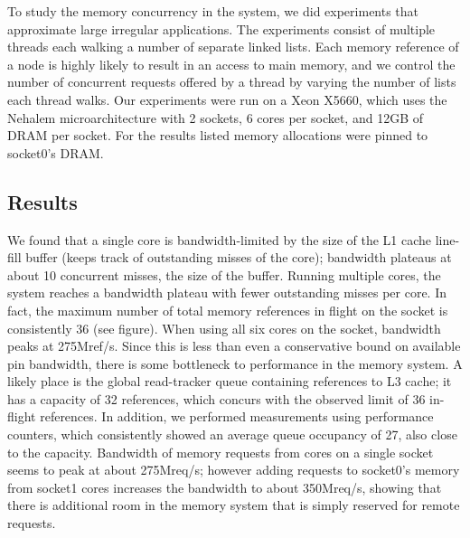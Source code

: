 

To study the memory concurrency in the system, we did experiments that approximate large irregular applications. The experiments consist of multiple threads each walking a number of separate linked lists. Each memory reference of a node is highly likely to result in an access to main memory, and we control the number of concurrent requests offered by a thread by varying the number of lists each thread walks.   Our experiments were run on a Xeon X5660, which uses the Nehalem microarchitecture with 2 sockets, 6 cores per socket, and 12GB of DRAM per socket. For the results listed memory allocations were pinned to socket0's DRAM.
\subsection{Results} 
	We found that a single core is bandwidth-limited by the size of the L1 cache line-fill buffer (keeps track of outstanding misses of the core); bandwidth plateaus at about 10 concurrent misses, the size of the buffer. Running multiple cores, the system reaches a bandwidth plateau with fewer outstanding misses per core. In fact, the maximum number of total memory references in flight on the socket is consistently 36 (see figure). When using all six cores on the socket, bandwidth peaks at 275Mref/s. Since this is less than even a conservative bound on available pin bandwidth, there is some bottleneck to performance in the memory system. A likely place is the global read-tracker queue containing references to L3 cache; it has a capacity of 32 references, which concurs with the observed limit of 36 in-flight references. In addition, we performed measurements using performance counters, which consistently showed an average queue occupancy of 27, also close to the capacity.
   
	Bandwidth of memory requests from cores on a single socket seems to peak at about 275Mreq/s; however adding requests to socket0's memory from socket1 cores increases the bandwidth to about	350Mreq/s, showing that there is additional room in the memory system that is simply reserved for remote requests.

